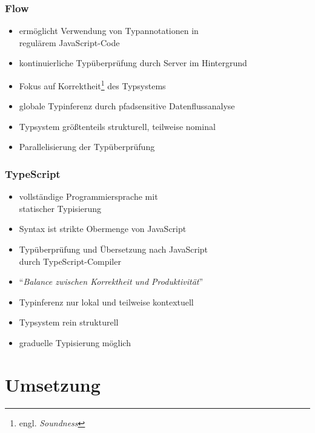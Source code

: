     \begin{frame}
      \frametitle{Flow}
      \begin{itemize}
        \item ermöglicht Verwendung von Typannotationen in\\ regulärem JavaScript-Code
        \item kontinuierliche Typüberprüfung durch Server im Hintergrund
        \item Fokus auf Korrektheit\footnote{engl. \textit{Soundness}} des Typsystems
        \item globale Typinferenz durch pfadsensitive Datenflussanalyse
        \item Typsystem größtenteils strukturell, teilweise nominal
        \item Parallelisierung der Typüberprüfung
      \end{itemize}
    \end{frame}

    \begin{frame}
      \frametitle{TypeScript}
      \begin{itemize}
        \item vollständige Programmiersprache mit\\statischer Typisierung
        \item Syntax ist strikte Obermenge von JavaScript
        \item Typüberprüfung und Übersetzung nach JavaScript\\durch TypeScript-Compiler
        \item \enquote{\textit{Balance zwischen Korrektheit und Produktivität}}~\autocite{TYPESCRIPT:DESIGN_GOALS}
        \item Typinferenz nur lokal und teilweise kontextuell
        \item Typsystem rein strukturell
        \item graduelle Typisierung möglich
      \end{itemize}
    \end{frame}

  \section{Umsetzung}

